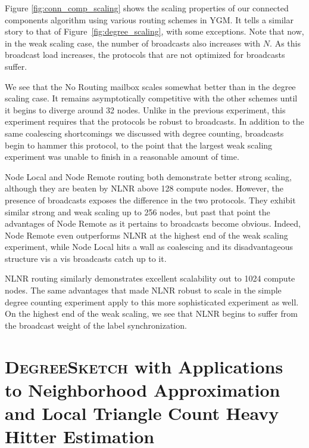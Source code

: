 \documentclass[10]{report}
\newcommand{\algoname}[1]{\textnormal{\textsc{#1}}}
\begin{document}
Figure \ref{fig:conn_comp_scaling} shows the scaling properties of our connected components algorithm using various routing schemes in YGM.
It tells a similar story to that of Figure~\ref{fig:degree_scaling}, with some exceptions.
Note that now, in the weak scaling case, the number of broadcasts also increases with $N$.
As this broadcast load increases, the protocols that are not optimized for broadcasts suffer.

We see that the No Routing mailbox scales somewhat better than in the degree scaling case.
It remains asymptotically competitive with the other schemes until it begins to diverge around 32 nodes. 
Unlike in the previous experiment, this experiment requires that the protocols be robust to broadcasts. 
In addition to the same coalescing shortcomings we discussed with degree counting, broadcasts begin to hammer this protocol, to the point that the largest weak scaling experiment was unable to finish in a reasonable amount of time. 


Node Local and Node Remote routing both demonstrate better strong scaling, although they are beaten by NLNR above 128 compute nodes. 
However, the presence of broadcasts exposes the difference in the two protocols. 
They exhibit similar strong and weak scaling up to 256 nodes, but past that point the advantages of Node Remote as it pertains to broadcasts become obvious. 
Indeed, Node Remote even outperforms NLNR at the highest end of the weak scaling experiment, while Node Local hits a wall as coalescing and its disadvantageous structure vis a vis broadcasts catch up to it. 


NLNR routing similarly demonstrates excellent scalability out to 1024 compute nodes. 
The same advantages that made NLNR robust to scale in the simple degree counting experiment apply to this more sophisticated experiment as well. 
On the highest end of the weak scaling, we see that NLNR begins to suffer from the broadcast weight of the label synchronization.






\chapter{\algoname{DegreeSketch} with Applications to Neighborhood Approximation and Local Triangle Count Heavy Hitter Estimation}
 \label{chap:DS}
\end{document}
